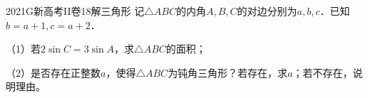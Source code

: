 
\begin{problem}{2021}{G}{新高考II卷}{18}{解三角形}
记$\triangle ABC$的内角$A,B,C$的对边分别为$a,b,c$．已知$b=a+1,c=a+2$．

（1）若$2\sin C=3\sin A$，求$\triangle ABC$的面积；

（2）是否存在正整数$a$，使得$\triangle ABC$为钝角三角形？若存在，求$a$；若不存在，说明理由。
\end{problem}